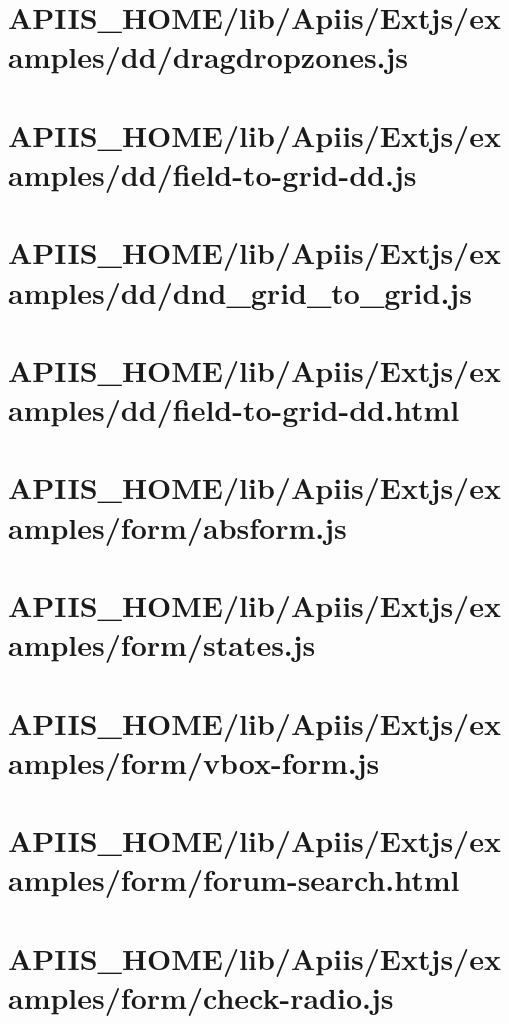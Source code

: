 \section{APIIS\_HOME/lib/Apiis/Extjs/examples/dd/dragdropzones.js} 
\section{APIIS\_HOME/lib/Apiis/Extjs/examples/dd/field-to-grid-dd.js} 
\section{APIIS\_HOME/lib/Apiis/Extjs/examples/dd/dnd\_grid\_to\_grid.js} 
\section{APIIS\_HOME/lib/Apiis/Extjs/examples/dd/field-to-grid-dd.html} 
\section{APIIS\_HOME/lib/Apiis/Extjs/examples/form/absform.js} 
\section{APIIS\_HOME/lib/Apiis/Extjs/examples/form/states.js} 
\section{APIIS\_HOME/lib/Apiis/Extjs/examples/form/vbox-form.js} 
\section{APIIS\_HOME/lib/Apiis/Extjs/examples/form/forum-search.html} 
\section{APIIS\_HOME/lib/Apiis/Extjs/examples/form/check-radio.js} 
